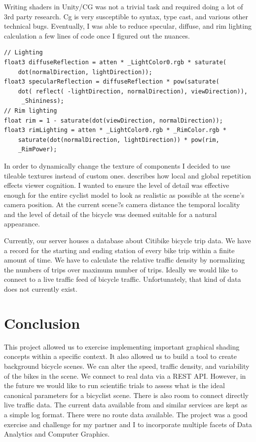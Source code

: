 \documentclass{scrartcl}
\begin{document}
Writing shaders in Unity/CG was not a trivial task and required doing a lot of 3rd party research.  Cg is very susceptible to syntax, type cast, and various other technical bugs.  Eventually, I was able to reduce specular, diffuse, and rim lighting calculation a few lines of code once I figured out the nuances.  

\begin{lstlisting} 
// Lighting
float3 diffuseReflection = atten * _LightColor0.rgb * saturate(
	dot(normalDirection, lightDirection));
float3 specularReflection = diffuseReflection * pow(saturate( 
	dot( reflect( -lightDirection, normalDirection), viewDirection)), 
	 _Shininess);
// Rim lighting
float rim = 1 - saturate(dot(viewDirection, normalDirection));	
float3 rimLighting = atten * _LightColor0.rgb * _RimColor.rgb * 
	saturate(dot(normalDirection, lightDirection)) * pow(rim, 
	_RimPower);
\end{lstlisting} 

In order to dynamically change the texture of components I decided to use tileable textures instead of custom ones. \citep{spatfrequency} describes how local and global  repetition effects viewer cognition.  I wanted to ensure the level of detail was effective enough for the entire cyclist model to look as realistic as possible at the scene's camera position.  At the current scene?s camera distance the temporal locality and the level of detail of the bicycle was deemed suitable for a natural appearance.

Currently, our server houses a database about Citibike bicycle trip data.  We have a record for the starting and ending station of every bike trip within a finite amount of time.  We have to calculate the relative traffic density by normalizing the numbers of trips over maximum number of trips.  Ideally we would like to connect to a live traffic feed of bicycle traffic.  Unfortunately, that kind of data does not currently exist.
		
\section{Conclusion} 
This project allowed us to exercise implementing important graphical shading concepts within a specific context. It also allowed us to build a tool to create background bicycle scenes.  We can alter the speed, traffic density, and variability of the bikes in the scene.  We connect to real data via a REST API.  However, in the future we would like to run scientific trials to assess what is the ideal canonical parameters for a bicyclist scene.  There is also room to connect directly live traffic data.  The current data available 	from \cite{citibike} and similar services are kept as a simple log format.  There were no route data available.  The project was a good exercise and challenge for my partner and I to incorporate multiple facets of Data Analytics and Computer Graphics.
        
\end{document}
